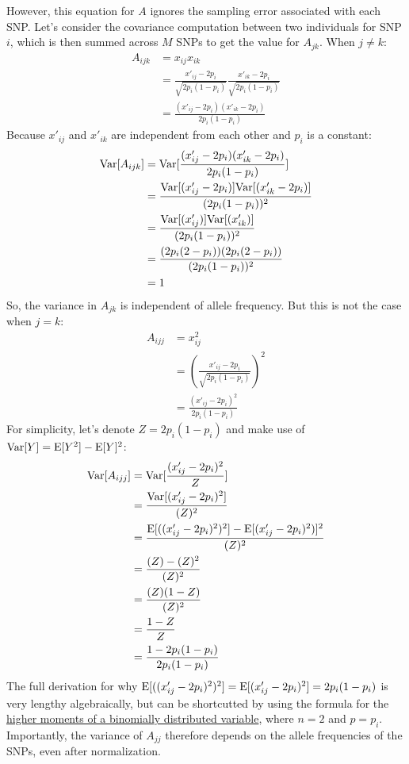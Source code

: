 \documentclass[12pt]{article}
\begin{document}
However, this equation for $A$ ignores the sampling error associated with each SNP.
Let's consider the covariance computation between two individuals for SNP $i$, which is then summed across $M$ SNPs to get the value for $A_{jk}$.
When $j \neq k$:
\begin{align*}
    A_{ijk} &= x_{ij} x_{ik} \\
    &= \frac{x'_{ij} - 2 p_i}{\sqrt{2 p_i (1 - p_i)}}
    \frac{x'_{ik} - 2 p_i}{\sqrt{2 p_i (1 - p_i)}} \\
    &= \frac{(x'_{ij} - 2 p_i)(x'_{ik} - 2 p_i)}{2 p_i (1 - p_i)}
\end{align*}
Because $x'_{ij}$ and $x'_{ik}$ are independent from each other and $p_i$ is a constant:
\begin{align*}
    \mathrm{Var}[A_{ijk}] &= \mathrm{Var}[\frac{(x'_{ij} - 2 p_i)(x'_{ik} - 2 p_i)}{2 p_i (1 - p_i)}] \\
    &= \frac{\mathrm{Var}[(x'_{ij} - 2 p_i)]\mathrm{Var}[(x'_{ik} - 2 p_i)]}{(2 p_i (1 - p_i))^2} \\
    &= \frac{\mathrm{Var}[(x'_{ij})]\mathrm{Var}[(x'_{ik})]}{(2 p_i (1 - p_i))^2} \\
    &= \frac{(2 p_i (2 - p_i))(2 p_i (2 - p_i))}{(2 p_i (1 - p_i))^2} \\
    &= 1
\end{align*}
So, the variance in $A_{jk}$ is independent of allele frequency. But this is not the case when $j = k$:
\begin{align*}
    A_{ijj} &= x_{ij}^2 \\
    &= (\frac{x'_{ij} - 2 p_i}{\sqrt{2 p_i (1 - p_i)}})^2 \\
    &= \frac{(x'_{ij} - 2 p_i)^2}{2 p_i (1 - p_i)}
\end{align*}
For simplicity, let's denote $Z = 2 p_i (1 - p_i)$ and make use of $\mathrm{Var}[Y] = \mathrm{E}[Y^2] - \mathrm{E}[Y]^2$:
\begin{align*}
    \mathrm{Var}[A_{ijj}] &= \mathrm{Var}[\frac{(x'_{ij} - 2 p_i)^2}{Z}] \\
    &= \frac{\mathrm{Var}[(x'_{ij} - 2 p_i)^2]}{(Z)^2} \\
    &= \frac{\mathrm{E}[((x'_{ij} - 2 p_i)^2)^2] - \mathrm{E}[(x'_{ij} - 2 p_i)^2)]^2}{(Z)^2} \\
    &= \frac{(Z) - (Z)^2}{(Z)^2} \\
    &= \frac{(Z)(1  - Z)}{(Z)^2} \\
    &= \frac{1  - Z}{Z} \\
    &= \frac{1  - 2 p_i (1 - p_i)}{2 p_i (1 - p_i)} \\
\end{align*}
The full derivation for why $\mathrm{E}[((x'_{ij} - 2 p_i)^2)^2] = \mathrm{E}[(x'_{ij} - 2 p_i)^2] = 2 p_i (1 - p_i)$ is very lengthy algebraically, but can be shortcutted by using the formula for the \href{https://en.wikipedia.org/wiki/Binomial_distribution#Higher_moments}{higher moments of a binomially distributed variable}, where $n=2$ and $p=p_i$.
Importantly, the variance of $A_{jj}$ therefore depends on the allele frequencies of the SNPs, even after normalization.
\end{document}
